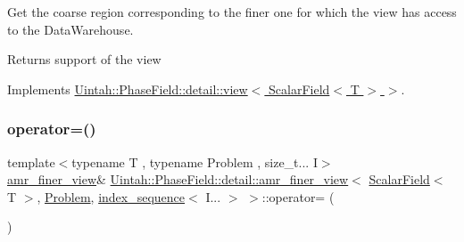 Get the coarse region corresponding to the finer one for which the view has access to the Data\+Warehouse. 

\begin{DoxyReturn}{Returns}
support of the view 
\end{DoxyReturn}


Implements \hyperlink{classUintah_1_1PhaseField_1_1detail_1_1view_3_01ScalarField_3_01T_01_4_01_4_a3e14b0c7a57a57707bb33954861ab1c1}{Uintah\+::\+Phase\+Field\+::detail\+::view$<$ Scalar\+Field$<$ T $>$ $>$}.

\mbox{\label{classUintah_1_1PhaseField_1_1detail_1_1amr__finer__view_3_01ScalarField_3_01T_01_4_00_01Problem_810ae3f886a4d3bdb2b37c629369a2ec_a5b17dfade19e5fa6db10f185917fe731}} 
\subsubsection{\texorpdfstring{operator=()}{operator=()}}
{\footnotesize\ttfamily template$<$typename T , typename Problem , size\+\_\+t... I$>$ \\
\hyperlink{classUintah_1_1PhaseField_1_1detail_1_1amr__finer__view}{amr\+\_\+finer\+\_\+view}\& \hyperlink{classUintah_1_1PhaseField_1_1detail_1_1amr__finer__view}{Uintah\+::\+Phase\+Field\+::detail\+::amr\+\_\+finer\+\_\+view}$<$ \hyperlink{structUintah_1_1PhaseField_1_1ScalarField}{Scalar\+Field}$<$ T $>$, \hyperlink{classUintah_1_1PhaseField_1_1Problem}{Problem}, \hyperlink{namespaceUintah_1_1PhaseField_a237de804d99512e50613aff7c94a9461}{index\+\_\+sequence}$<$ I... $>$ $>$\+::operator= (\begin{DoxyParamCaption}\item[{const \hyperlink{classUintah_1_1PhaseField_1_1detail_1_1amr__finer__view}{amr\+\_\+finer\+\_\+view}$<$ \hyperlink{structUintah_1_1PhaseField_1_1ScalarField}{Scalar\+Field}$<$ T $>$, \hyperlink{classUintah_1_1PhaseField_1_1Problem}{Problem}, \hyperlink{namespaceUintah_1_1PhaseField_a237de804d99512e50613aff7c94a9461}{index\+\_\+sequence}$<$ I... $>$ $>$ \&}]{ }\end{DoxyParamCaption})\hspace{0.3cm}{\ttfamily [delete]}}




